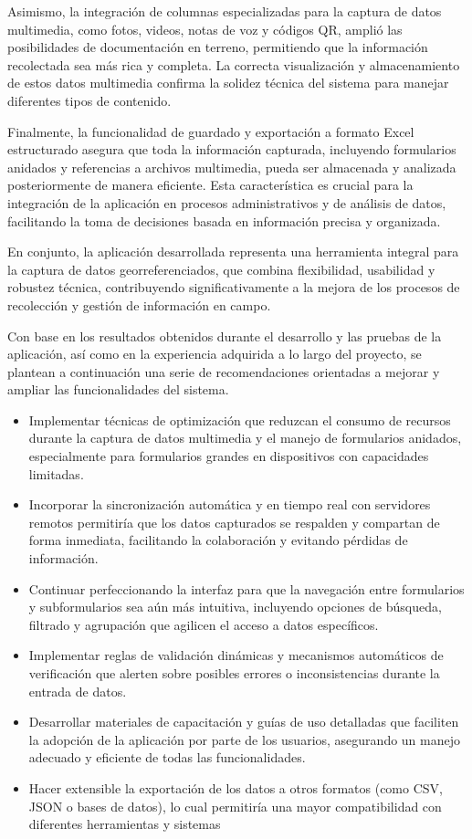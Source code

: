 \documentclass[12pt, a4paper]{book}
\begin{document}
Asimismo, la integración de columnas especializadas para la captura de datos multimedia, como fotos, videos, notas de voz y códigos QR, amplió las posibilidades de documentación en terreno, permitiendo que la información recolectada sea más rica y completa. La correcta visualización y almacenamiento de estos datos multimedia confirma la solidez técnica del sistema para manejar diferentes tipos de contenido.

Finalmente, la funcionalidad de guardado y exportación a formato Excel estructurado asegura que toda la información capturada, incluyendo formularios anidados y referencias a archivos multimedia, pueda ser almacenada y analizada posteriormente de manera eficiente. Esta característica es crucial para la integración de la aplicación en procesos administrativos y de análisis de datos, facilitando la toma de decisiones basada en información precisa y organizada.

En conjunto, la aplicación desarrollada representa una herramienta integral para la captura de datos georreferenciados, que combina flexibilidad, usabilidad y robustez técnica, contribuyendo significativamente a la mejora de los procesos de recolección y gestión de información en campo.

Con base en los resultados obtenidos durante el desarrollo y las pruebas de la aplicación, así como en la experiencia adquirida a lo largo del proyecto, se plantean a continuación una serie de recomendaciones orientadas a mejorar y ampliar las funcionalidades del sistema. 

\begin{itemize}
  \item Implementar técnicas de optimización que reduzcan el consumo de recursos durante la captura de datos multimedia y el manejo de formularios anidados, especialmente para formularios grandes en dispositivos con capacidades limitadas.
  \item Incorporar la sincronización automática y en tiempo real con servidores remotos permitiría que los datos capturados se respalden y compartan de forma inmediata, facilitando la colaboración y evitando pérdidas de información.
  \item Continuar perfeccionando la interfaz para que la navegación entre formularios y subformularios sea aún más intuitiva, incluyendo opciones de búsqueda, filtrado y agrupación que agilicen el acceso a datos específicos.
  \item Implementar reglas de validación dinámicas y mecanismos automáticos de verificación que alerten sobre posibles errores o inconsistencias durante la entrada de datos.
  \item Desarrollar materiales de capacitación y guías de uso detalladas que faciliten la adopción de la aplicación por parte de los usuarios, asegurando un manejo adecuado y eficiente de todas las funcionalidades.
  \item Hacer extensible la exportación de los datos a otros formatos (como CSV, JSON o bases de datos), lo cual permitiría una mayor compatibilidad con diferentes herramientas y sistemas
\end{itemize}
\end{document}
